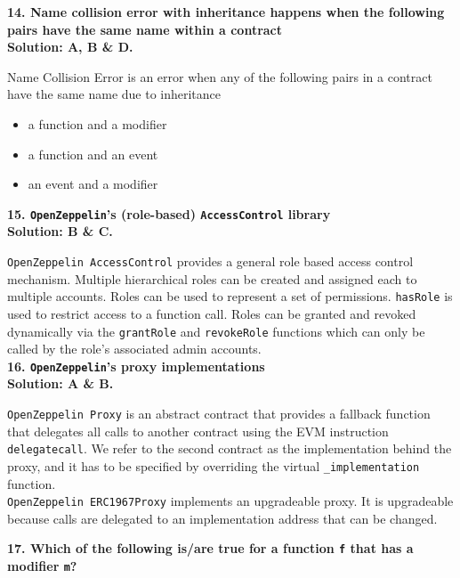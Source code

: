 \textbf{14. Name collision error with inheritance happens when the following pairs have the same name within a contract}\label{sec:exam3_q14}\\

\textbf{Solution: A, B \& D.}

Name Collision Error is an error when any of the following pairs in a contract have the same name due to inheritance

\begin{itemize}
    \item a function and a modifier
    \item a function and an event
    \item an event and a modifier
\end{itemize}

\textbf{15. \texttt{OpenZeppelin}'s (role-based) \texttt{AccessControl} library}\label{sec:exam3_q15}\\

\textbf{Solution: B \& C.}

\verb|OpenZeppelin AccessControl| provides a general role based access control mechanism.
Multiple hierarchical roles can be created and assigned each to multiple accounts.
Roles can be used to represent a set of permissions.
\verb|hasRole| is used to restrict access to a function call.
Roles can be granted and revoked dynamically via the \verb|grantRole| and \verb|revokeRole| functions which can only be called by the role's associated admin accounts.\\

\textbf{16. \texttt{OpenZeppelin}'s proxy implementations}\label{sec:exam3_q16}\\

\textbf{Solution: A \& B.}

\verb|OpenZeppelin Proxy| is an abstract contract that provides a fallback function that delegates all calls to another contract using the EVM instruction \verb|delegatecall|.
We refer to the second contract as the implementation behind the proxy, and it has to be specified by overriding the virtual \verb|_implementation| function.\\

\verb|OpenZeppelin ERC1967Proxy| implements an upgradeable proxy.
It is upgradeable because calls are delegated to an implementation address that can be changed.\\

\pagebreak

\textbf{17. Which of the following is/are true for a function \texttt{f} that has a modifier \texttt{m}?}\label{sec:exam3_q17}\\

